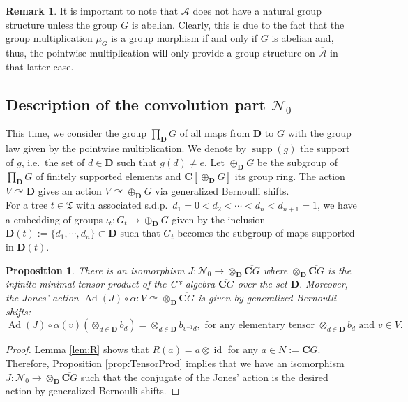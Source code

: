 \documentclass[a4paper,12pt]{amsart}
\numberwithin{equation}{section}
\newtheorem{proposition}[theo]{Proposition}
\theoremstyle{definition}
\newtheorem{remark}[theo]{Remark}
\DeclareMathOperator{\id}{id}
\newcommand{\act}{\curvearrowright}
\newcommand{\al}{\alpha}
\newcommand{\oscrA}{{\overline{\mathscr{A}}}}
\DeclareMathOperator{\Ad}{Ad}
\newcommand{\C}{\mathbf C}
\newcommand{\D}{\mathbf D}
\newcommand{\scrN}{\mathscr N}
\newcommand{\ot}{\otimes}\newcommand{\otmin}{\otimes_{\text{min}}}
\DeclareMathOperator{\supp}{supp}
\newcommand{\fT}{\mathfrak T}
\begin{document}
\begin{remark}
It is important to note that $\oscrA$ does not have a natural group structure unless the group $G$ is abelian. 
Clearly, this is due to the fact that the group multiplication $\mu_G$ is a group morphism if and only if $G$ is abelian and, thus, the pointwise multiplication will only provide a group structure on $\oscrA$ in that latter case.
\end{remark}

\subsection{Description of the convolution part $\scrN_0$}\label{sec:Convolution}
This time, we consider the group $\prod_\D G$ of all maps from $\D$ to $G$ with the group law given by the pointwise multiplication. We denote by $\supp(g)$ the support of $g$, i.e.~the set of $d\in\D$ such that $g(d)\neq e$.
Let $\oplus_\D G$ be the subgroup of $\prod_\D G$ of finitely supported elements and $\C[ \oplus_\D G]$ its group ring. 
The action $V\act \D$ gives an action $V\act \oplus_\D G$ via generalized Bernoulli shifts.\\[0.1cm]
For a tree $t\in\fT$ with associated s.d.p.~$d_1=0<d_2<\cdots<d_n<d_{n+1}=1$, we have a embedding of groups $\iota_t :G_t\to \oplus_\D G$ given by the inclusion $\D(t):=\{d_1,\cdots,d_n\}\subset \D$ such that $G_t$ becomes the subgroup of maps supported in $\D(t)$.

\begin{proposition}
There is an isomorphism $J:\scrN_0\to \otimes_\D \overline{\C G}$ where $\otimes_\D \overline{\C G}$ is the infinite minimal tensor product of the C*-algebra $\overline{\C G}$ over the set $\D.$
Moreover, the Jones' action $\Ad(J)\circ\al:V\act \otimes_\D \overline{\C G}$ is given by generalized Bernoulli shifts: 
$$\Ad(J)\circ\al(v)(\ot_{d\in\D} b_d) = \ot_{d\in\D} b_{v^{-1}d} , \text{ for any elementary tensor } \ot_{d\in\D} b_d \text{ and }  v\in V.$$
\end{proposition}

\begin{proof}
Lemma \ref{lem:R} shows that $R(a)=a\ot \id$ for any $a\in N:=\overline{\C G}.$
Therefore, Proposition \ref{prop:TensorProd} implies that we have an isomorphism $J:\scrN_0\to \otimes_\D \overline{\C G}$ such that the conjugate of the Jones' action is the desired action by generalized Bernoulli shifts.
\end{proof}
\end{document}
